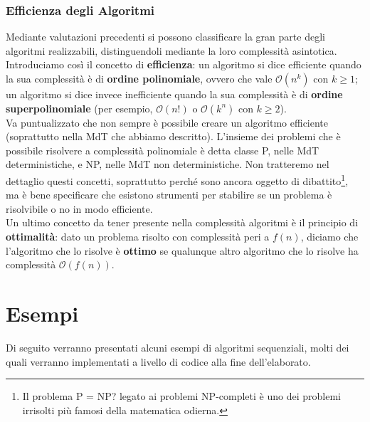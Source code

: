 \subsection{Efficienza degli Algoritmi}
Mediante valutazioni precedenti si possono classificare la gran parte degli algoritmi realizzabili, distinguendoli mediante la loro complessità asintotica. Introduciamo così il concetto di \textbf{efficienza}: un algoritmo si dice efficiente quando la sua complessità è di \textbf{ordine polinomiale}, ovvero che vale $\mathcal{O}(n^k)$ con $k \geq 1$; un algoritmo si dice invece inefficiente quando la sua complessità è di \textbf{ordine superpolinomiale} (per esempio, $\mathcal{O}(n!)$ o $\mathcal{O}(k^n)$ con $k \geq 2$).\\
Va puntualizzato che non sempre è possibile creare un algoritmo efficiente (soprattutto nella MdT che abbiamo descritto). L'insieme dei problemi che è possibile risolvere a complessità polinomiale è detta classe P, nelle MdT deterministiche, e NP, nelle MdT non deterministiche. Non tratteremo nel dettaglio questi concetti, soprattutto perché sono ancora oggetto di dibattito\footnote{Il problema P = NP? legato ai problemi NP-completi è uno dei problemi irrisolti più famosi della matematica odierna.}, ma è bene specificare che esistono strumenti per stabilire se un problema è risolvibile o no in modo efficiente.\\
Un ultimo concetto da tener presente nella complessità algoritmi è il principio di \textbf{ottimalità}: dato un problema risolto con complessità peri a $f(n)$, diciamo che l'algoritmo che lo risolve è \textbf{ottimo} se qualunque altro algoritmo che lo risolve ha complessità $\mathcal{O}(f(n))$.
\chapter{Esempi}
Di seguito verranno presentati alcuni esempi di algoritmi sequenziali, molti dei quali verranno implementati a livello di codice alla fine dell'elaborato.
